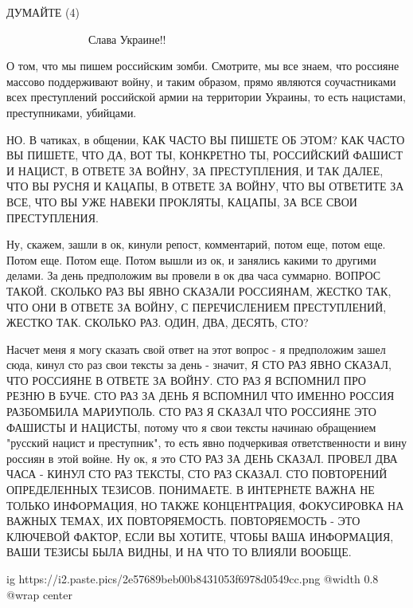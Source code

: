  
 
 
 
 

ДУМАЙТЕ (4)

💛 💙 💛 💙 💛 💙 💛 💙 💛 💙 💛 💙            
Слава Украине!! 

О том, что мы пишем российским зомби. Смотрите, мы все знаем, что россияне
массово поддерживают войну, и таким образом, прямо являются соучастниками всех
преступлений российской армии на территории Украины, то есть нацистами,
преступниками, убийцами.

НО. В чатиках, в общении, КАК ЧАСТО ВЫ ПИШЕТЕ ОБ ЭТОМ?  КАК ЧАСТО ВЫ ПИШЕТЕ,
ЧТО ДА, ВОТ ТЫ, КОНКРЕТНО ТЫ, РОССИЙСКИЙ ФАШИСТ И НАЦИСТ, В ОТВЕТЕ ЗА ВОЙНУ, ЗА
ПРЕСТУПЛЕНИЯ, И ТАК ДАЛЕЕ, ЧТО ВЫ РУСНЯ И КАЦАПЫ, В ОТВЕТЕ ЗА ВОЙНУ, ЧТО ВЫ
ОТВЕТИТЕ ЗА ВСЕ, ЧТО ВЫ УЖЕ НАВЕКИ ПРОКЛЯТЫ, КАЦАПЫ, ЗА ВСЕ СВОИ ПРЕСТУПЛЕНИЯ.

Ну, скажем, зашли в ок, кинули репост, комментарий, потом еще, потом еще.
Потом еще. Потом еще. Потом вышли из ок, и занялись какими то другими делами.
За день предположим вы провели в ок два часа суммарно. ВОПРОС ТАКОЙ. СКОЛЬКО
РАЗ ВЫ ЯВНО СКАЗАЛИ РОССИЯНАМ, ЖЕСТКО ТАК, ЧТО ОНИ В ОТВЕТЕ ЗА ВОЙНУ, С
ПЕРЕЧИСЛЕНИЕМ ПРЕСТУПЛЕНИЙ, ЖЕСТКО ТАК. СКОЛЬКО РАЗ. ОДИН, ДВА, ДЕСЯТЬ, СТО?

Насчет меня я могу сказать свой ответ на этот вопрос - я предположим зашел
сюда, кинул сто раз свои тексты за день - значит, Я СТО РАЗ ЯВНО СКАЗАЛ, ЧТО
РОССИЯНЕ В ОТВЕТЕ ЗА ВОЙНУ. СТО РАЗ Я ВСПОМНИЛ ПРО РЕЗНЮ В БУЧЕ. СТО РАЗ ЗА
ДЕНЬ Я ВСПОМНИЛ ЧТО ИМЕННО РОССИЯ РАЗБОМБИЛА МАРИУПОЛЬ. СТО РАЗ Я СКАЗАЛ ЧТО
РОССИЯНЕ ЭТО ФАШИСТЫ И НАЦИСТЫ, потому что я свои тексты начинаю обращением
"русский нацист и преступник", то есть явно подчеркивая ответственности и вину
россиян в этой войне. Ну ок, я это СТО РАЗ ЗА ДЕНЬ СКАЗАЛ. ПРОВЕЛ ДВА ЧАСА -
КИНУЛ СТО РАЗ ТЕКСТЫ, СТО РАЗ СКАЗАЛ.  СТО ПОВТОРЕНИЙ ОПРЕДЕЛЕННЫХ ТЕЗИСОВ.
ПОНИМАЕТЕ. В ИНТЕРНЕТЕ ВАЖНА НЕ ТОЛЬКО ИНФОРМАЦИЯ, НО ТАКЖЕ КОНЦЕНТРАЦИЯ,
ФОКУСИРОВКА НА ВАЖНЫХ ТЕМАХ, ИХ ПОВТОРЯЕМОСТЬ. ПОВТОРЯЕМОСТЬ - ЭТО КЛЮЧЕВОЙ
ФАКТОР, ЕСЛИ ВЫ ХОТИТЕ, ЧТОБЫ ВАША ИНФОРМАЦИЯ, ВАШИ ТЕЗИСЫ БЫЛА ВИДНЫ, И НА ЧТО
ТО ВЛИЯЛИ ВООБЩЕ.

\ifcmt
  ig https://i2.paste.pics/2e57689beb00b8431053f6978d0549cc.png
  @width 0.8
  @wrap center
\fi

